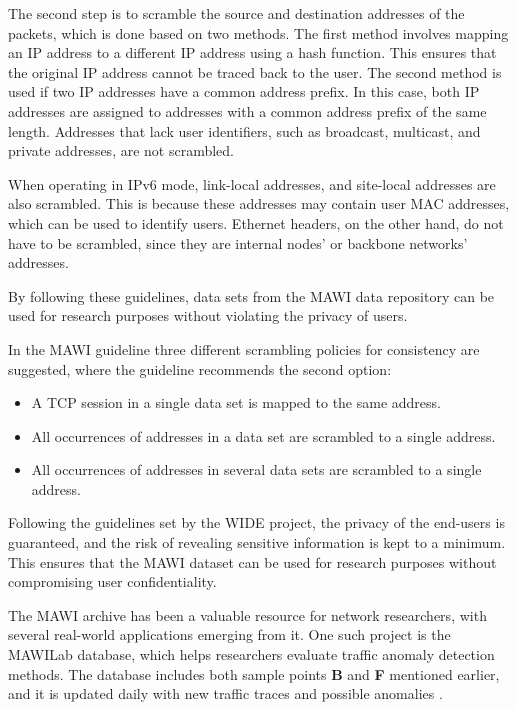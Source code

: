 \documentclass[sigconf,authorversion,nonacm]{acmart}
\begin{document}
The second step is to scramble the source and destination addresses of the packets, which is done based on two methods. The first method involves mapping an IP address to a different IP address using a hash function. This ensures that the original IP address cannot be traced back to the user. The second method is used if two IP addresses have a common address prefix. In this case, both IP addresses are assigned to addresses with a common address prefix of the same length. Addresses that lack user identifiers, such as broadcast, multicast, and private addresses, are not scrambled.

When operating in IPv6 mode, link-local addresses, and site-local addresses are also scrambled. This is because these addresses may contain user MAC addresses, which can be used to identify users. Ethernet headers, on the other hand, do not have to be scrambled, since they are internal nodes' or backbone networks' addresses. 

By following these guidelines, data sets from the MAWI data repository can be used for research purposes without violating the privacy of users.

In the MAWI guideline three different scrambling policies for consistency are suggested, where the guideline recommends the second option:
\begin{itemize}
    \item A TCP session in a single data set is mapped to the same address. 
    \item All occurrences of addresses in a data set are scrambled to a single address.
    \item All occurrences of addresses in several data sets are scrambled to a single address.
\end{itemize}

Following the guidelines set by the WIDE project, the privacy of the end-users is guaranteed, and the risk of revealing sensitive information is kept to a minimum. This ensures that the MAWI dataset can be used for research purposes without compromising user confidentiality.

The MAWI archive has been a valuable resource for network researchers, with several real-world applications emerging from it. One such project is the MAWILab database, which helps researchers evaluate traffic anomaly detection methods. The database includes both sample points \textbf{B} and \textbf{F} mentioned earlier, and it is updated daily with new traffic traces and possible anomalies  \cite{mawilab}. 
\end{document}
